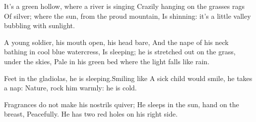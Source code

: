 It’s a green hollow, where a river is singing
Crazily hanging on the grasses rags
Of silver; where the sun, from the proud mountain,
Is shinning: it’s a little valley bubbling with sunlight.

A young soldier, his mouth open, his head bare,
And the nape of his neck bathing in cool blue watercress,
Is sleeping; he is stretched out on the grass, under the skies,
Pale in his green bed where the light falls like rain.

Feet in the gladiolas, he is sleeping.Smiling like
A sick child would smile, he takes a nap:
Nature, rock him warmly: he is cold.

Fragrances do not make his nostrils quiver;
He sleeps in the sun, hand on the breast,
Peacefully. He has two red holes on his right side.
